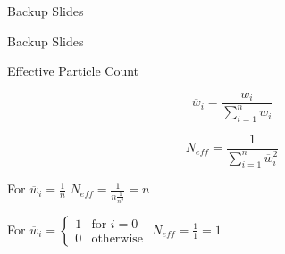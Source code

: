 \documentclass{beamer}
\begin{document}

\begin{frame}{Backup Slides}

Backup Slides

\end{frame}


\begin{frame}{Effective Particle Count}

\begin{equation}
\overline{w}_{i} = \frac{w_{i}}{\sum_{i=1}^{n} w_{i}}
\end{equation}

\vspace{0.2cm}

\begin{equation}
N_{eff} = \frac{1}{\sum_{i=1}^{n} \overline{w}_{i}^2}
\end{equation}

\vspace{1cm}

\begin{center}

For \hspace{0.3cm} \(\overline{w}_{i}=\frac{1}{n}\) \hspace{2.4cm} \(N_{eff} = \frac{1}{n\frac{1}{n^2}} = n \)

\vspace{1cm}

For \hspace{0.3cm} \(
\overline{w}_{i} = \begin{cases}

  1 & \text{for $i=0$} \\

  0 & \text{otherwise}

\end{cases}
\)\hspace{0.4cm} \(N_{eff} = \frac{1}{1} = 1 \)

\end{center}

\end{frame}

\end{document}
